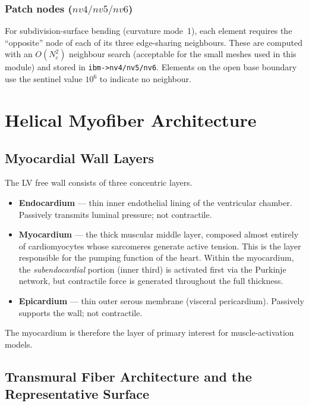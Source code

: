 \documentclass[11pt,a4paper]{article}
\begin{document}
\subsubsection*{Patch nodes ($nv4/nv5/nv6$)}

For subdivision-surface bending (curvature mode~1), each element requires the
``opposite'' node of each of its three edge-sharing neighbours.  These are
computed with an $O(N_e^2)$ neighbour search (acceptable for the small meshes
used in this module) and stored in \texttt{ibm->nv4/nv5/nv6}.  Elements on
the open base boundary use the sentinel value $10^6$ to indicate no neighbour.

\section{Helical Myofiber Architecture}

\subsection{Myocardial Wall Layers}

The LV free wall consists of three concentric layers.

\begin{itemize}
  \item \textbf{Endocardium} — thin inner endothelial lining of the ventricular
        chamber.  Passively transmits luminal pressure; not contractile.
  \item \textbf{Myocardium} — the thick muscular middle layer, composed almost
        entirely of cardiomyocytes whose sarcomeres generate active tension.
        This is the layer responsible for the pumping function of the heart.
        Within the myocardium, the \emph{subendocardial} portion (inner third)
        is activated first via the Purkinje network, but contractile force is
        generated throughout the full thickness.
  \item \textbf{Epicardium} — thin outer serous membrane (visceral pericardium).
        Passively supports the wall; not contractile.
\end{itemize}

The myocardium is therefore the layer of primary interest for muscle-activation
models.

\subsection{Transmural Fiber Architecture and the Representative Surface}
\end{document}
